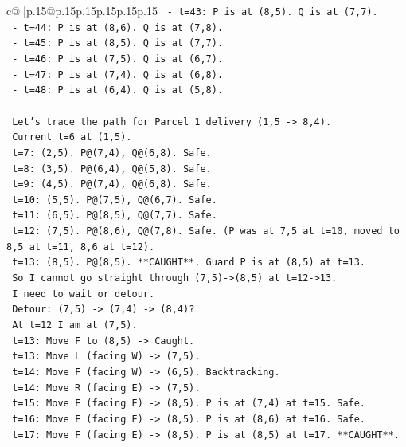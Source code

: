 \documentclass{article}
\begin{document}
{\begin{supertabular}{c@{$\;$}|p{.15\linewidth}@{}p{.15\linewidth}p{.15\linewidth}p{.15\linewidth}p{.15\linewidth}p{.15\linewidth}}
{{{\texttt{    {-} t=43: P is at (8,5). Q is at (7,7).} \\
\texttt{    {-} t=44: P is at (8,6). Q is at (7,8).} \\
\texttt{    {-} t=45: P is at (8,5). Q is at (7,7).} \\
\texttt{    {-} t=46: P is at (7,5). Q is at (6,7).} \\
\texttt{    {-} t=47: P is at (7,4). Q is at (6,8).} \\
\texttt{    {-} t=48: P is at (6,4). Q is at (5,8).} \\
\\ 
\texttt{    Let's trace the path for Parcel 1 delivery (1,5 {-}> 8,4).} \\
\texttt{    Current t=6 at (1,5).} \\
\texttt{    t=7: (2,5). P@(7,4), Q@(6,8). Safe.} \\
\texttt{    t=8: (3,5). P@(6,4), Q@(5,8). Safe.} \\
\texttt{    t=9: (4,5). P@(7,4), Q@(6,8). Safe.} \\
\texttt{    t=10: (5,5). P@(7,5), Q@(6,7). Safe.} \\
\texttt{    t=11: (6,5). P@(8,5), Q@(7,7). Safe.} \\
\texttt{    t=12: (7,5). P@(8,6), Q@(7,8). Safe. (P was at 7,5 at t=10, moved to 8,5 at t=11, 8,6 at t=12).} \\
\texttt{    t=13: (8,5). P@(8,5). **CAUGHT**. Guard P is at (8,5) at t=13.} \\
\texttt{    So I cannot go straight through (7,5){-}>(8,5) at t=12{-}>13.} \\
\texttt{    I need to wait or detour.} \\
\texttt{    Detour: (7,5) {-}> (7,4) {-}> (8,4)?} \\
\texttt{    At t=12 I am at (7,5).} \\
\texttt{    t=13: Move F to (8,5) {-}> Caught.} \\
\texttt{    t=13: Move L (facing W) {-}> (7,5).} \\
\texttt{    t=14: Move F (facing W) {-}> (6,5). Backtracking.} \\
\texttt{    t=14: Move R (facing E) {-}> (7,5).} \\
\texttt{    t=15: Move F (facing E) {-}> (8,5). P is at (7,4) at t=15. Safe.} \\
\texttt{    t=16: Move F (facing E) {-}> (8,5). P is at (8,6) at t=16. Safe.} \\
\texttt{    t=17: Move F (facing E) {-}> (8,5). P is at (8,5) at t=17. **CAUGHT**.} \\
}}}
\end{supertabular}}
\end{document}
